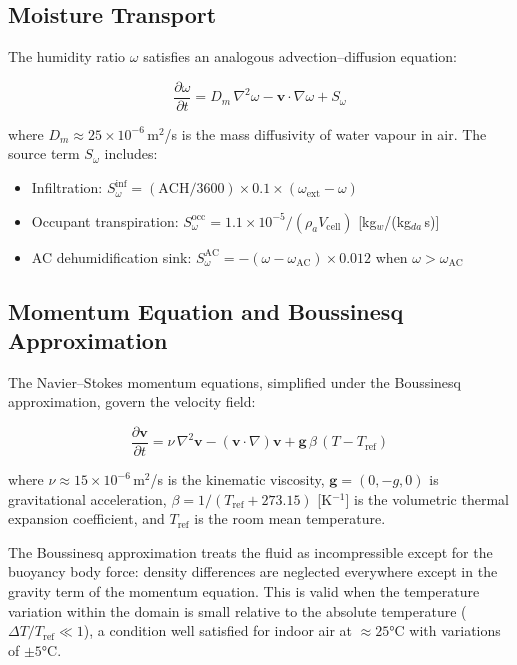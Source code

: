 \documentclass[12pt,a4paper]{report}
\begin{document}
\subsection{Moisture Transport}
\label{subsec:moisture}

The humidity ratio $\omega$ satisfies an analogous advection--diffusion equation:

\begin{equation}
  \frac{\partial \omega}{\partial t} = D_m\,\nabla^2\omega - \mathbf{v}\cdot\nabla\omega + S_\omega
  \label{eq:moisture}
\end{equation}

where $D_m \approx 25\times10^{-6}$\,m$^2$/s is the mass diffusivity of water vapour in air. The source term $S_\omega$ includes:

\begin{itemize}
  \item Infiltration: $S_\omega^\text{inf} = (\text{ACH}/3600)\times 0.1\times(\omega_\text{ext} - \omega)$
  \item Occupant transpiration: $S_\omega^\text{occ} = 1.1\times10^{-5}/(\rho_a V_\text{cell})$ [kg$_w$/(kg$_{da}$\,s)]
  \item AC dehumidification sink: $S_\omega^\text{AC} = -(\omega - \omega_\text{AC})\times 0.012$ when $\omega > \omega_\text{AC}$
\end{itemize}

\subsection{Momentum Equation and Boussinesq Approximation}
\label{subsec:momentum}

The Navier--Stokes momentum equations, simplified under the Boussinesq approximation, govern the velocity field:

\begin{equation}
  \frac{\partial \mathbf{v}}{\partial t} = \nu\,\nabla^2\mathbf{v} - (\mathbf{v}\cdot\nabla)\mathbf{v} + \mathbf{g}\,\beta\,(T - T_\text{ref})
  \label{eq:momentum}
\end{equation}

where $\nu \approx 15\times10^{-6}$\,m$^2$/s is the kinematic viscosity, $\mathbf{g} = (0,-g,0)$ is gravitational acceleration, $\beta = 1/(T_\text{ref}+273.15)$ [K$^{-1}$] is the volumetric thermal expansion coefficient, and $T_\text{ref}$ is the room mean temperature.

The Boussinesq approximation \cite{boussinesq1903} treats the fluid as incompressible except for the buoyancy body force: density differences are neglected everywhere except in the gravity term of the momentum equation. This is valid when the temperature variation within the domain is small relative to the absolute temperature ($\Delta T/T_\text{ref} \ll 1$), a condition well satisfied for indoor air at $\approx 25$°C with variations of $\pm 5$°C.
\end{document}
